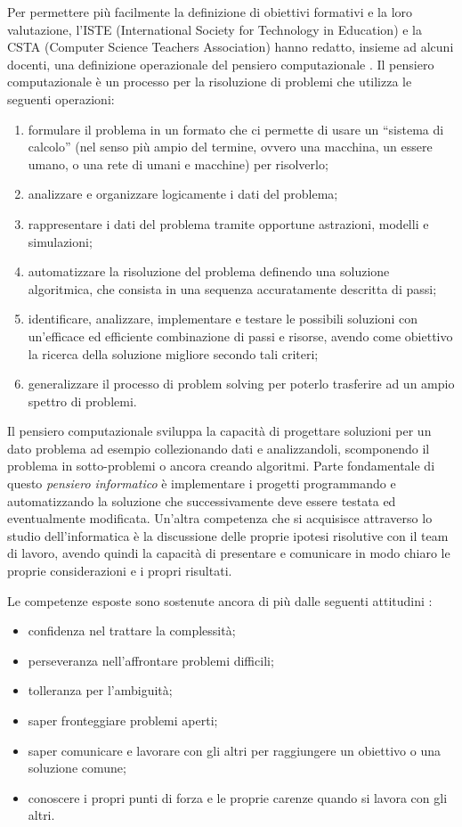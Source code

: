 \documentclass[12pt]{report}
\begin{document}
Per permettere più facilmente la definizione di obiettivi formativi e la loro valutazione, l'ISTE (International Society for Technology in Education) e la CSTA (Computer Science Teachers Association) hanno redatto, insieme ad alcuni docenti, una definizione operazionale del pensiero computazionale \cite{flayerCT}. Il pensiero computazionale è un processo per la risoluzione di problemi che utilizza le seguenti operazioni:
\begin{enumerate}[label=(\alph*)]
	\item formulare il problema in un formato che ci permette di usare un ``sistema di calcolo'' (nel senso più ampio del termine, ovvero una macchina, un essere umano, o una rete di umani e macchine) per risolverlo;
	\item analizzare e organizzare logicamente i dati del problema;
	\item rappresentare i dati del problema tramite opportune astrazioni, modelli e simulazioni;
	\item automatizzare la risoluzione del problema definendo una soluzione algoritmica, che consista in una sequenza accuratamente descritta di passi;
	\item identificare, analizzare, implementare e testare le possibili soluzioni con un'efficace ed efficiente combinazione di passi e risorse, avendo come obiettivo la ricerca della soluzione migliore secondo tali criteri;
	\item generalizzare il processo di problem solving per poterlo trasferire ad un ampio spettro di problemi.
\end{enumerate}

Il pensiero computazionale sviluppa la capacità di progettare soluzioni per un dato problema ad esempio collezionando dati e analizzandoli, scomponendo il problema in sotto-problemi o ancora creando algoritmi.
Parte fondamentale di questo \textit{pensiero informatico} è implementare i progetti programmando e automatizzando la soluzione che successivamente deve essere testata ed eventualmente modificata. Un'altra competenza che si acquisisce attraverso lo studio dell'informatica è la discussione delle proprie ipotesi risolutive con il team di lavoro, avendo quindi la capacità di presentare e comunicare in modo chiaro le proprie considerazioni e i propri risultati.



Le competenze esposte sono sostenute ancora di più dalle seguenti attitudini \cite{attitudiniCT}:
\begin{itemize}
	\item confidenza nel trattare la complessità;
	\item perseveranza nell'affrontare problemi difficili;
	\item tolleranza per l'ambiguità;
	\item saper fronteggiare problemi aperti;
	\item saper comunicare e lavorare con gli altri per raggiungere un obiettivo o una soluzione comune;
	\item conoscere i propri punti di forza e le proprie carenze quando si lavora con gli altri.
\end{itemize}
\end{document}
